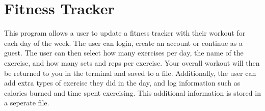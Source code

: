 \chapter{Fitness Tracker}
\hypertarget{index}{}\label{index}
\label{index_md__c_1_2_users_2medhi_2_one_drive_01-_01_technological_01_university_01_dublin_21st_01_year_2_documents_2_git_hub_2_t_u821-_fitness-_tracker_2_r_e_a_d_m_e}%
%
 This program allows a user to update a fitness tracker with their workout for each day of the week. The user can login, create an account or continue as a guest. The user can then select how many exercises per day, the name of the exercise, and how many sets and reps per exercise. Your overall workout will then be returned to you in the terminal and saved to a file. Additionally, the user can add extra types of exercise they did in the day, and log information such as calories burned and time spent exercising. This additional information is stored in a seperate file. 